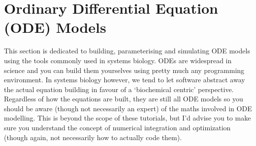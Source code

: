 \documentclass[../main]{subfiles}
\begin{document}
    \section{Ordinary Differential Equation (ODE) Models}
    This section is dedicated to building, parameterising and simulating ODE models using the tools
    commonly used in systems biology. ODEs are widespread in science and you can build them yourselves
    using pretty much any programming environment. In systems biology however, we tend to let
    software abstract away the actual equation building in favour of a `biochemical centric' perspective. Regardless
    of how the equations are built, they are still all ODE models so you should be aware (though not necessarily an
    expert) of the maths involved in ODE modelling. This is beyond the scope of these tutorials, but I'd advise you
    to make sure you understand the concept of numerical integration and optimization (though again, not necessarily how
    to actually code them).

    
    
    
\end{document}
